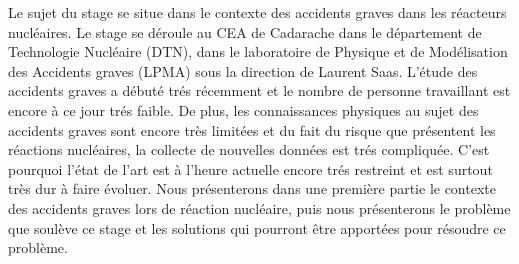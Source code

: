 Le sujet du stage se situe dans le contexte des accidents graves dans les réacteurs nucléaires. Le stage se déroule au CEA de Cadarache dans le département de Technologie Nucléaire (DTN), dans le laboratoire de Physique et de Modélisation des Accidents graves (LPMA) sous la direction de Laurent Saas. L'étude des accidents graves a débuté trés récemment et le nombre de personne travaillant est encore à ce jour trés faible. De plus, les connaissances physiques au sujet des accidents graves sont encore très limitées et du fait du risque que présentent les réactions nucléaires, la collecte de nouvelles données est trés compliquée. C'est pourquoi l'état de l'art est à l'heure actuelle encore trés restreint et est surtout très dur à faire évoluer. Nous présenterons dans une première partie le contexte des accidents graves lors de réaction nucléaire, puis nous présenterons le problème que soulève ce stage et les solutions qui pourront être apportées pour résoudre ce problème.